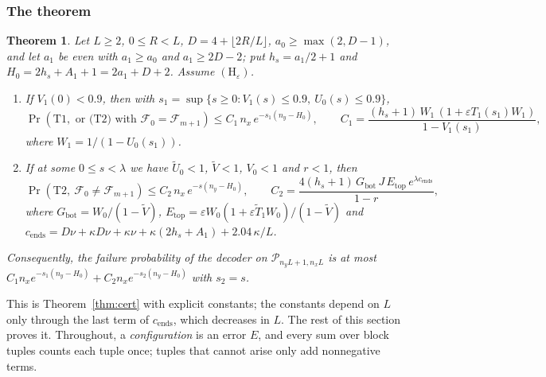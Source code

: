 \documentclass[11pt]{amsart}
\newtheorem{theorem}{Theorem}[section]
\theoremstyle{definition}
\theoremstyle{remark}
\numberwithin{equation}{section}
\newcommand{\cF}{\mathcal{F}}
\newcommand{\eps}{\varepsilon}
\newcommand{\Ut}{\tilde U_0}
\newcommand{\Tt}{\tilde T}
\begin{document}
\subsubsection{The theorem}
\begin{theorem}\label{s1:thm:main}
Let $L\ge2$, $0\le R<L$, $D=4+\lfloor2R/L\rfloor$, $a_0\ge\max(2,D-1)$, and let $a_1$ be even with $a_1\ge a_0$ and $a_1\ge2D-2$; put $h_s=a_1/2+1$ and $H_0=2h_s+A_1+1=2a_1+D+2$. Assume $(\mathrm H_\eps)$.
\begin{enumerate}[label=(\alph*),leftmargin=2em]
\item If $V_1(0)<0.9$, then with $s_1=\sup\{s\ge0:V_1(s)\le0.9,\ U_0(s)\le0.9\}$,
\[
\Pr(\mathrm{T1},\text{ or (T2) with }\cF_0=\cF_{m+1})\le C_1\,n_x\,e^{-s_1(n_y-H_0)},\qquad C_1=\frac{(h_s+1)\,W_1\,(1+\eps T_1(s_1)W_1)}{1-V_1(s_1)},
\]
where $W_1=1/(1-U_0(s_1))$.
\item If at some $0\le s<\lambda$ we have $\Ut<1$, $\tilde V<1$, $V_0<1$ and $r<1$, then
\[
\Pr(\mathrm{T2},\ \cF_0\ne\cF_{m+1})\le C_2\,n_x\,e^{-s(n_y-H_0)},\qquad C_2=\frac{4(h_s+1)\,G_{\mathrm{bot}}\,J\,E_{\mathrm{top}}\,e^{\lambda c_{\mathrm{ends}}}}{1-r},
\]
where $G_{\mathrm{bot}}=W_0/(1-\tilde V)$, $E_{\mathrm{top}}=\eps W_0(1+\eps\Tt_1W_0)/(1-\tilde V)$ and $c_{\mathrm{ends}}=D\nu+\kappa D\nu+\kappa\nu+\kappa(2h_s+A_1)+2.04\,\kappa/L$.
\end{enumerate}
Consequently, the failure probability of the decoder on $\mathcal P_{n_yL+1,n_xL}$ is at most $C_1n_xe^{-s_1(n_y-H_0)}+C_2n_xe^{-s_2(n_y-H_0)}$ with $s_2=s$.
\end{theorem}

This is Theorem~\ref{thm:cert} with explicit constants; the constants depend on $L$ only through the last term of $c_{\mathrm{ends}}$, which decreases in $L$. The rest of this section proves it. Throughout, a \emph{configuration} is an error $E$, and every sum over block tuples counts each tuple once; tuples that cannot arise only add nonnegative terms.
\end{document}
